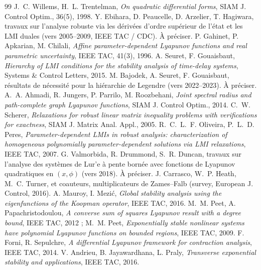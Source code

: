\documentclass[11pt,a4paper]{article}
\theoremstyle{definition}
\theoremstyle{remark}
\begin{document}
\begin{thebibliography}{99}\small
{} J.~C. Willems, H.~L. Trentelman, \emph{On quadratic differential forms}, SIAM J. Control Optim., 36(5), 1998.
 Y. Ebihara, D. Peaucelle, D. Arzelier, T. Hagiwara, travaux sur l'analyse robuste via les dérivées d'ordre supérieur de l'état et les LMI duales (vers 2005–2009, IEEE TAC / CDC). À préciser.
 P. Gahinet, P. Apkarian, M. Chilali, \emph{Affine parameter-dependent Lyapunov functions and real parametric uncertainty}, IEEE TAC, 41(3), 1996.
 A. Seuret, F. Gouaisbaut, \emph{Hierarchy of LMI conditions for the stability analysis of time-delay systems}, Systems \& Control Letters, 2015.
 M. Bajodek, A. Seuret, F. Gouaisbaut, résultats de nécessité pour la hiérarchie de Legendre (vers 2022–2023). À préciser.
 A.~A. Ahmadi, R. Jungers, P. Parrilo, M. Roozbehani, \emph{Joint spectral radius and path-complete graph Lyapunov functions}, SIAM J. Control Optim., 2014.
 C.~W. Scherer, \emph{Relaxations for robust linear matrix inequality problems with verifications for exactness}, SIAM J. Matrix Anal. Appl., 2005.
 R.~C.~L.~F. Oliveira, P.~L.~D. Peres, \emph{Parameter-dependent LMIs in robust analysis: characterization of homogeneous polynomially parameter-dependent solutions via LMI relaxations}, IEEE TAC, 2007.
 G. Valmorbida, R. Drummond, S.~R. Duncan, travaux sur l'analyse des systèmes de Lur'e à pente bornée avec fonctions de Lyapunov quadratiques en $(x,\phi)$ (vers 2018). À préciser.
 J. Carrasco, W.~P. Heath, M.~C. Turner, et coauteurs, multiplicateurs de Zames–Falb (survey, European J. Control, 2016).
 A. Mauroy, I. Mezić, \emph{Global stability analysis using the eigenfunctions of the Koopman operator}, IEEE TAC, 2016.
 M.~M. Peet, A. Papachristodoulou, \emph{A converse sum of squares Lyapunov result with a degree bound}, IEEE TAC, 2012 ; M.~M. Peet, \emph{Exponentially stable nonlinear systems have polynomial Lyapunov functions on bounded regions}, IEEE TAC, 2009.
 F. Forni, R. Sepulchre, \emph{A differential Lyapunov framework for contraction analysis}, IEEE TAC, 2014.
 V. Andrieu, B. Jayawardhana, L. Praly, \emph{Transverse exponential stability and applications}, IEEE TAC, 2016.
\end{thebibliography}
\end{document}
